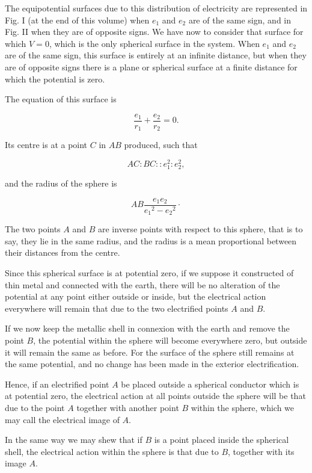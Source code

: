 \documentclass[11pt,a4paper]{article}
\begin{document}
The equipotential surfaces due to this distribution of electricity are represented in Fig. I (at the end of this volume) when $e_1$ and $e_2$ are of the same sign, and in Fig. II when they are of opposite signs. We have now to consider that surface for which $V=0$, which is the only spherical surface in the system. When $e_1$ and $e_2$ are of the same sign, this surface is entirely at an infinite distance, but when they are of opposite signs there is a plane or spherical surface at a finite distance for which the potential is zero.

The equation of this surface is

\begin{equation}\tag{2}
\frac{e_1}{r_1}+\frac{e_2}{r_2}=0.
\end{equation}

Its centre is at a point $C$ in $AB$ produced, such that

\[
AC:BC::e_1^2:e_2^2,
\]

and the radius of the sphere is

\[
AB\frac{e_{1}e_{2}}{{e_{1}}^{2}-{e_{2}}^{2}}\cdot
\]

The two points $A$ and $B$ are inverse points with respect to this sphere, that is to say, they lie in the same radius, and the radius is a mean proportional between their distances from the centre.

Since this spherical surface is at potential zero, if we suppose it constructed of thin metal and connected with the earth, there will be no alteration of the potential at any point either outside or inside, but the electrical action everywhere will remain that due to the two electrified points $A$ and $B$.

If we now keep the metallic shell in connexion with the earth and remove the point $B$, the potential within the sphere will become everywhere zero, but outside it will remain the same as before. For the surface of the sphere still remains at the same potential, and no change has been made in the exterior electrification.

Hence, if an electrified point $A$ be placed outside a spherical conductor which is at potential zero, the electrical action at all points outside the sphere will be that due to the point $A$ together with another point $B$ within the sphere, which we may call the electrical image of $A$.

In the same way we may shew that if $B$ is a point placed inside the spherical shell, the electrical action within the sphere is that due to $B$, together with its image $A$.
\end{document}
